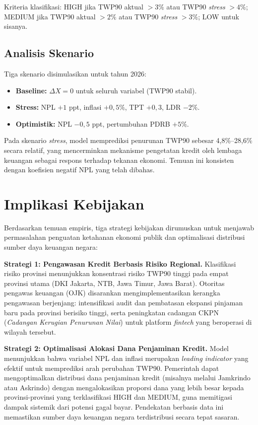 \documentclass[12pt,a4paper]{article}
\begin{document}
Kriteria klasifikasi: HIGH jika TWP90 aktual $> 3\%$ atau TWP90 \textit{stress} $> 4\%$; MEDIUM jika TWP90 aktual $> 2\%$ atau TWP90 \textit{stress} $> 3\%$; LOW untuk sisanya.

\subsection{Analisis Skenario}

Tiga skenario disimulasikan untuk tahun 2026:
\begin{itemize}
\item \textbf{Baseline:} $\Delta X = 0$ untuk seluruh variabel (TWP90 stabil).
\item \textbf{Stress:} NPL $+1$ ppt, inflasi $+0{,}5\%$, TPT $+0{,}3$, LDR $-2\%$.
\item \textbf{Optimistik:} NPL $-0{,}5$ ppt, pertumbuhan PDRB $+5\%$.
\end{itemize}

Pada skenario \textit{stress}, model memprediksi penurunan TWP90 sebesar 4,8\%--28,6\% secara relatif, yang mencerminkan mekanisme pengetatan kredit oleh lembaga keuangan sebagai respons terhadap tekanan ekonomi. Temuan ini konsisten dengan koefisien negatif NPL yang telah dibahas.

\section{Implikasi Kebijakan}

Berdasarkan temuan empiris, tiga strategi kebijakan dirumuskan untuk menjawab permasalahan penguatan ketahanan ekonomi publik dan optimalisasi distribusi sumber daya keuangan negara:

\textbf{Strategi 1: Pengawasan Kredit Berbasis Risiko Regional.} Klasifikasi risiko provinsi menunjukkan konsentrasi risiko TWP90 tinggi pada empat provinsi utama (DKI Jakarta, NTB, Jawa Timur, Jawa Barat). Otoritas pengawas keuangan (OJK) disarankan mengimplementasikan kerangka pengawasan berjenjang: intensifikasi audit dan pembatasan ekspansi pinjaman baru pada provinsi berisiko tinggi, serta peningkatan cadangan CKPN (\textit{Cadangan Kerugian Penurunan Nilai}) untuk platform \textit{fintech} yang beroperasi di wilayah tersebut.

\textbf{Strategi 2: Optimalisasi Alokasi Dana Penjaminan Kredit.} Model menunjukkan bahwa variabel NPL dan inflasi merupakan \textit{leading indicator} yang efektif untuk memprediksi arah perubahan TWP90. Pemerintah dapat mengoptimalkan distribusi dana penjaminan kredit (misalnya melalui Jamkrindo atau Askrindo) dengan mengalokasikan proporsi dana yang lebih besar kepada provinsi-provinsi yang terklasifikasi HIGH dan MEDIUM, guna memitigasi dampak sistemik dari potensi gagal bayar. Pendekatan berbasis data ini memastikan sumber daya keuangan negara terdistribusi secara tepat sasaran.
\end{document}
